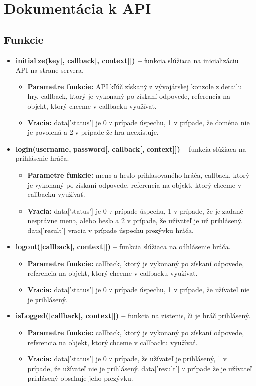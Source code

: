 \chapter{Dokumentácia k API}
\label{pr:dokumentacia}
\section{Funkcie}
\begin{itemize}
\item \textbf{initialize(key[, callback[, context]]) –} funkcia slúžiaca na inicializáciu API na strane servera. 
\begin{itemize}
\item \textbf{Parametre funkcie:} API kľúč získaný z vývojárskej konzole z detailu hry, callback, ktorý je vykonaný po získaní odpovede, referencia na objekt, ktorý chceme v callbacku využívať. 
\item \textbf{Vracia:} data['status'] je 0 v prípade úspechu, 1 v prípade, že doména nie je povolená a 2 v prípade že hra neexistuje.
\end{itemize}

\item \textbf{login(username, password[, callback[, context]]) –} funkcia slúžiaca na prihlásenie hráča.
\begin{itemize}
\item \textbf{Parametre funkcie:} meno a heslo prihlasovaného hráča, callback, ktorý je vykonaný po získaní odpovede, referencia na objekt, ktorý chceme v callbacku využívať. 
\item \textbf{Vracia:} data['status'] je 0 v prípade úspechu, 1 v prípade, že je zadané nesprávne meno, alebo heslo a 2 v prípade, že užívateľ je už prihlásený. data['result'] vracia v prípade úspechu prezývku hráča.
\end{itemize}

\item \textbf{logout([callback[, context]]) –} funkcia slúžiaca na odhlásenie hráča.
\begin{itemize}
\item \textbf{Parametre funkcie:} callback, ktorý je vykonaný po získaní odpovede, referencia na objekt, ktorý chceme v callbacku využívať. 
\item \textbf{Vracia:} data['status'] je 0 v prípade úspechu, 1 v prípade, že užívateľ nie je prihlásený.
\end{itemize}

\item \textbf{isLogged([callback[, context]]) –} funkcia na zistenie, či je hráč prihlásený.
\begin{itemize}
\item \textbf{Parametre funkcie:} callback, ktorý je vykonaný po získaní odpovede, referencia na objekt, ktorý chceme v callbacku využívať. 
\item \textbf{Vracia:} data['status'] je 0 v prípade, že užívateľ je prihlásený, 1 v prípade, že užívateľ nie je prihlásený. data['result'] v prípade že je užívateľ prihlásený obsahuje jeho prezývku.
\end{itemize}


\end{itemize}
